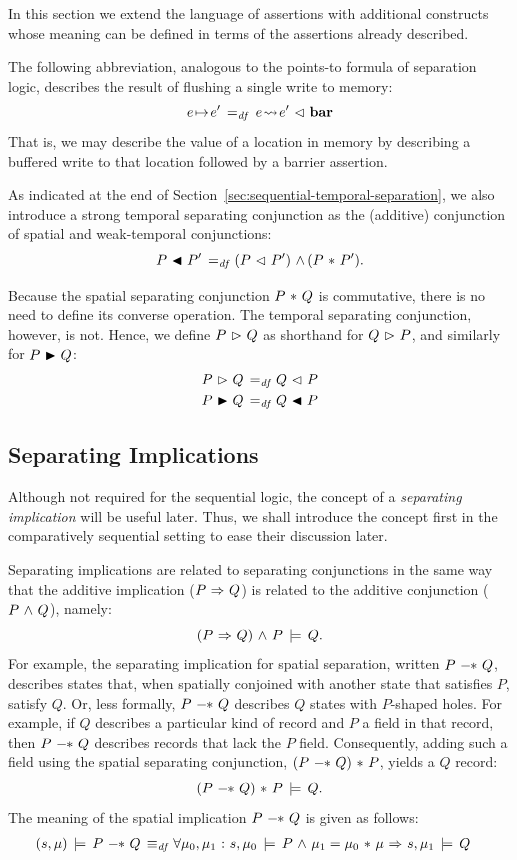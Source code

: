 \documentclass[11pt]{report}
\begin{document}
In this section we extend the language of assertions with additional constructs whose meaning can be defined in terms of the assertions already described. 

The following abbreviation, analogous to the points-to formula of separation logic, describes the result of flushing a single write to memory: \[
    e \!\mapsto\! e' \operatorname{\;=_{\mathit{df}}\;} e \!\leadsto\! e' \operatorname{\,\vartriangleleft\,} \mathbf{bar} \] That is, we may describe the value of a location in memory by describing a buffered write to that location followed by a barrier assertion. 

As indicated at the end of Section~\ref{sec:sequential-temporal-separation}, we also introduce a strong temporal separating conjunction as the (additive) conjunction of spatial and weak-temporal conjunctions: \[ P \operatorname{\,\blacktriangleleft\,} P' \operatorname{\;=_{\mathit{df}}\;} (P \operatorname{\,\vartriangleleft\,} P') \operatorname{\,\wedge\,} (P \operatorname{\,\ast\,} P').\]

Because the spatial separating conjunction $P \operatorname{\,\ast\,} Q$ is commutative, there is no need to define its converse operation. The temporal separating conjunction, however, is not. Hence, we define $P \operatorname{\,\vartriangleright\,} Q$ as shorthand for $Q \operatorname{\,\vartriangleright\,} P$, and similarly for $P \operatorname{\,\blacktriangleright\,} Q$: \begin{align*}
  P \operatorname{\,\vartriangleright\,} Q \operatorname{\;=_{\mathit{df}}\;} & Q \operatorname{\,\vartriangleleft\,} P \\ 
  P \operatorname{\,\blacktriangleright\,} Q \operatorname{\;=_{\mathit{df}}\;} & Q \operatorname{\,\blacktriangleleft\,} P \\ 
\end{align*}

\subsection{Separating Implications}
\label{sec:separating-implications}

Although not required for the sequential logic, the concept of a \emph{separating implication} will be useful later. Thus, we shall introduce the concept first in the comparatively sequential setting to ease their discussion later.

Separating implications are related to separating conjunctions in the same way that the additive implication ($P \operatorname{\,\Rightarrow\,} Q$) is related to the additive conjunction ($P \operatorname{\,\wedge\,} Q$), namely: \[ (P \operatorname{\,\Rightarrow\,} Q) \operatorname{\,\wedge\,} P \,\models\, Q.\] For example, the separating implication for spatial separation, written $P \fsepi Q$, describes states that, when spatially conjoined with another state that satisfies $P$, satisfy $Q$. Or, less formally, $P \fsepi Q$ describes $Q$ states with $P$-shaped holes. For example, if $Q$ describes a particular kind of record and $P$ a field in that record, then $P \fsepi Q$ describes records that lack the $P$ field. Consequently, adding such a field using the spatial separating conjunction, $(P \fsepi Q) \fsep P$, yields a $Q$ record: \[ (P \fsepi Q) \fsep P \sentails Q.\] The meaning of the spatial implication $P \fsepi Q$ is given as follows: \begin{align*} (s,\mu) \sentails P \fsepi Q \iffdef & \forall \mu_0,\mu_1 \st s,\mu_0 \sentails P \conj \mu_1 = \mu_0 \fsep \mu \onlyif  s,\mu_1 \sentails Q \end{align*} 
\end{document}
